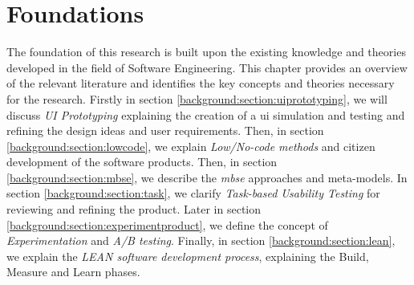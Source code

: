 
\chapter{Foundations} 
\ifpdf
    \graphicspath{{Chapters/Background/Figs/}{Chapters/Background/Figs/}{Chapters/Background/Figs/}}
\else
    \graphicspath{{Chapters/Background/Figs/}{Chapters/Background/Figs/}}
\fi
The foundation of this research is built upon the existing knowledge and theories developed in the field of Software Engineering.
This chapter provides an overview of the relevant literature and identifies the key concepts and theories necessary for the research. 
Firstly in section \ref{background:section:uiprototyping}, we will discuss \textit{UI Prototyping} explaining the creation of a \ac{ui} simulation and testing and refining the design ideas and user requirements.
Then, in section \ref{background:section:lowcode}, we explain \textit{Low/No-code methods} and citizen development of the software products. 
Then, in section \ref{background:section:mbse}, we describe the \textit{\ac{mbse}} approaches and meta-models.
In section \ref{background:section:task}, we clarify \textit{Task-based Usability Testing} for reviewing and refining the product. 
Later in section \ref{background:section:experimentproduct}, we define the concept of \textit{Experimentation} and \textit{A/B testing}. 
Finally, in section \ref{background:section:lean}, we explain the \textit{LEAN software development process}, explaining the Build, Measure and Learn phases.

